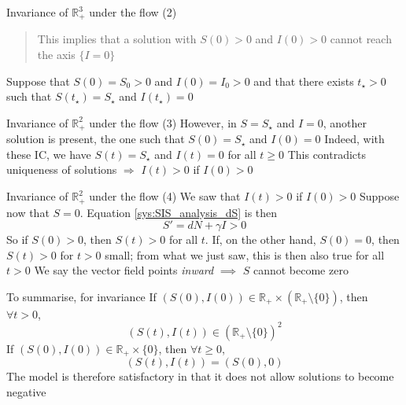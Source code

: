 \documentclass[aspectratio=43]{beamer}
\begin{document}
\begin{frame}{Invariance of $\mathbb{R}_+^3$ under the flow (2)} 
\begin{quote}
  This implies that a solution with $S(0)>0$ and $I(0)>0$ cannot reach the axis $\{I=0\}$  
\end{quote}
\vfill
Suppose that $S(0)=S_0>0$ and $I(0)=I_0>0$ and that there exists $t_\star>0$ such that $S(t_\star)=S_\star$ and $I(t_\star)=0$
\begin{center}
\end{center}
\end{frame}

\begin{frame}{Invariance of $\mathbb{R}_+^2$ under the flow (3)} 
However, in $S=S_\star$ and $I=0$, another solution is present, the one such that $S(0)=S_\star$ and $I(0)=0$ 
\vfill
Indeed, with these IC, we have $S(t)=S_\star$ and $I(t)=0$ for all $t\geq 0$
\vfill
This contradicts uniqueness of solutions 
\vfill
$\Rightarrow$ $I(t)>0$ if $I(0)>0$
\end{frame}

\begin{frame}{Invariance of $\mathbb{R}_+^2$ under the flow (4)} 
We saw that $I(t)>0$ if $I(0)>0$
\vfill
Suppose now that $S=0$. Equation \eqref{sys:SIS_analysis_dS} is then
$$
S' = dN+\gamma I>0
$$
\vfill
So if $S(0)>0$, then $S(t)>0$ for all $t$. If, on the other hand, $S(0)=0$, then $S(t)>0$ for $t>0$ small; from what we just saw, this is then also true for all $t>0$
\vfill
We say the vector field points \emph{inward}
\vfill
$\implies$ $S$ cannot become zero
\end{frame}

\begin{frame}{To summarise, for invariance} 
\bbullet If $(S(0),I(0))\in\mathbb{R}_+\times(\mathbb{R}_+\setminus\{0\})$, then $\forall t>0$,
$$(S(t),I(t))\in(\mathbb{R}_+\setminus\{0\})^2$$
\vfill
\bbullet If $(S(0),I(0))\in\mathbb{R}_+\times\{0\}$, then $\forall t\geq 0$, 
$$(S(t),I(t))=(S(0),0)$$
\vfill
The model is therefore satisfactory in that it does not allow solutions to become negative
\end{frame}
\end{document}
